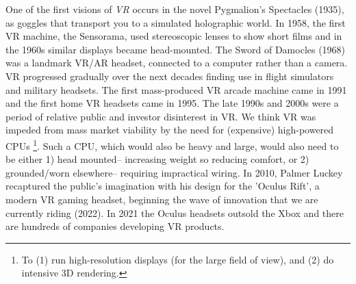 \documentclass[logo,bsc,singlespacing,parskip]{infthesis}
\begin{document}
One of the first visions of \emph{VR} occurs in the novel Pygmalion's Spectacles (1935), as goggles that transport you to a simulated holographic world.
In 1958, the first VR machine, the Sensorama, used stereoscopic lenses to show short films and in the 1960s similar displays became head-mounted.
The Sword of Damocles (1968) was a landmark VR/AR headset, connected to a computer rather than a camera.
VR progressed gradually over the next decades finding use in flight simulators and military headsets.
The first mass-produced VR arcade machine came in 1991 and the first home VR headsets came in 1995.
The late 1990s and 2000s were a period of relative public and investor disinterest in VR.
We think VR was impeded from mass market viability by the need for (expensive) high-powered CPUs \footnote{To (1) run high-resolution displays (for the large field of view), and (2) do intensive 3D rendering.}.
Such a CPU, which would also be heavy and large, would also need to be either 1) head mounted-- increasing weight so reducing comfort, or 2) grounded/worn elsewhere-- requiring impractical wiring.
In 2010, Palmer Luckey recaptured the public's imagination with his design for the 'Oculus Rift', a modern VR gaming headset, beginning the wave of innovation that we are currently riding (2022).
In 2021 the Oculus headsets outsold the Xbox and there are hundreds of companies developing VR products.
\end{document}
